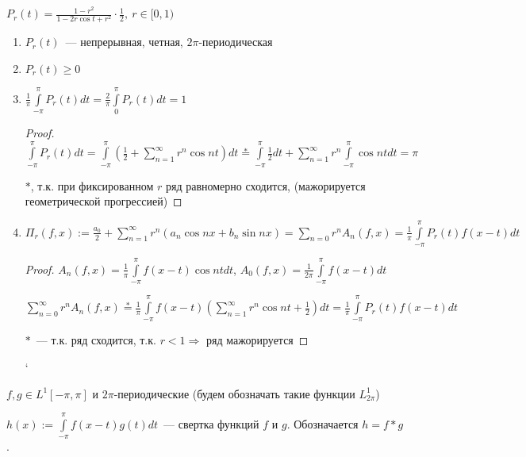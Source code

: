 \begin{properties}
    $P_r(t) = \frac{1 - r^2}{1 -2r\cos t  + r^2} \cdot \frac{1}{2},\ r \in [0, 1)$
    \begin{enumerate}
        \item $P_r(t)$~--- непрерывная, четная, $2\pi$-периодическая
        \item $P_r(t) \geq 0$
        \item $\frac{1}{\pi} \int\limits_{-\pi}^\pi P_r(t) dt = \frac{2}{\pi}\int\limits_0^\pi P_r(t)dt = 1$
              \begin{proof}
                  $\int\limits_{-\pi}^\pi P_r(t)dt = \int\limits_{-\pi}^{\pi}(\frac{1}{2} + \sum\limits_{n = 1}^\infty r^n\cos nt) dt \overset{*}{=} \int\limits_{-\pi}^\pi \frac{1}{2} dt + \sum\limits_{n = 1}^\infty r^n\int\limits_{-\pi}^\pi\cos nt dt = \pi$
                  
                  $*$, т.к. при фиксированном $r$ ряд равномерно сходится, (мажорируется геометрической прогрессией)
              \end{proof}
        \item $\Pi_r(f, x) := \frac{a_0}{2} + \sum\limits_{n = 1}^\infty r^n(a_n\cos nx + b_n\sin nx) = \sum\limits_{n = 0}r^nA_n(f, x) = \frac{1}{\pi}\int\limits_{-\pi}^\pi P_r(t)f(x - t)dt$
              \begin{proof}
                  $A_n(f, x) = \frac{1}{\pi}\int\limits_{-\pi}^\pi f(x - t) \cos nt dt$, $A_0(f, x) = \frac{1}{2\pi} \int\limits_{-\pi}^\pi f(x - t)dt$
                  
                  $\sum\limits_{n =0}^\infty r^nA_n(f, x) \overset{*}{=} \frac{1}{\pi}\int\limits_{-\pi}^{\pi}f(x-t)(\sum\limits_{n = 1}^\infty r^n \cos nt + \frac{1}{2})dt = \frac{1}{\pi} \int\limits_{-\pi}^\pi P_r(t)f(x - t) dt$
                  
                  $*$~--- т.к. ряд сходится, т.к. $r < 1 \Rightarrow$ ряд мажорируется
              \end{proof}
              `	\end{enumerate}
\end{properties}

\begin{definition}
    $f, g \in L^1[-\pi, \pi]$ и $2\pi$-периодические (будем обозначать такие функции $L^1_{2\pi}$)
    
    $h(x) := \int\limits_{-\pi}^\pi f(x - t)g(t)dt$~--- свертка функций $f$ и $g$. Обозначается $h = f \ast g$.
\end{definition}

